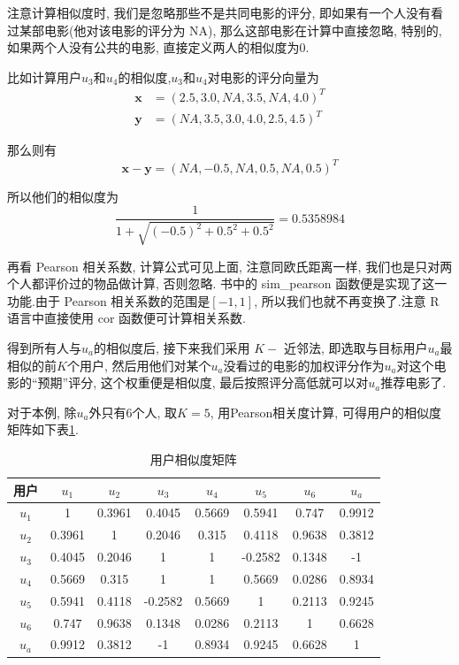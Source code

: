 \documentclass[a4paper,UTF8]{ctexart}
\theoremstyle{plain} \newtheorem{theorem}{定理}[section]
\theoremstyle{plain} \newtheorem{definition}{定义}[section]
\theoremstyle{plain} \newtheorem{lemma}{引理}[section]
\theoremstyle{plain} \newtheorem{proposition}{命题}[section]
\theoremstyle{plain} \newtheorem{example}{例}[section]
\theoremstyle{plain} \newtheorem{remark}{注}[section]
\theoremstyle{plain} \newtheorem{corollary}{推论}[section]
\begin{document}
注意计算相似度时, 我们是忽略那些不是共同电影的评分, 即如果有一个人没有看过某部电影(他对该电影的评分为 NA), 那么这部电影在计算中直接忽略, 特别的, 如果两个人没有公共的电影, 直接定义两人的相似度为$0$.

比如计算用户$u_3$和$u_4$的相似度,$u_3$和$u_4$对电影的评分向量为
\begin{align*}
\bm{x} & = (2.5, 3.0, NA, 3.5, NA, 4.0)^{T} \\ 
\bm{y} & = (NA, 3.5, 3.0, 4.0, 2.5, 4.5)^{T}
\end{align*}

那么则有
\begin{equation*}
\bm{x} - \bm{y} = (NA, -0.5, NA, 0.5, NA, 0.5)^{T}
\end{equation*}

所以他们的相似度为
\begin{equation*}
\frac{1}{1+ \sqrt{(-0.5)^2 + 0.5^2 + 0.5^2}} = 0.5358984
\end{equation*}

再看 Pearson 相关系数, 计算公式可见上面, 注意同欧氏距离一样, 我们也是只对两个人都评价过的物品做计算, 否则忽略. 书中的 sim\_pearson 函数便是实现了这一功能.由于 Pearson 相关系数的范围是$[-1,1]$, 所以我们也就不再变换了.注意 R 语言中直接使用 cor 函数便可计算相关系数.

得到所有人与$u_a$的相似度后, 接下来我们采用 $K-$ 近邻法, 即选取与目标用户$u_a$最相似的前$K$个用户, 然后用他们对某个$u_a$没看过的电影的加权评分作为$u_a$对这个电影的“预期”评分, 这个权重便是相似度, 最后按照评分高低就可以对$u_a$推荐电影了.

对于本例, 除$u_a$外只有$6$个人, 取$K=5$, 用Pearson相关度计算, 可得用户的相似度矩阵如下表\ref{simuser}.
\begin{table}[!htb]
\centering
\caption{用户相似度矩阵}
\label{simuser}
\begin{tabular}{c|c|c|c|c|c|c|c}
	\hline
    用户 & $u_1$ & $u_2$ & $u_3$ & $u_4$ & $u_5$ & $u_6$ & $u_a$ \\
    \hline
	$u_1$ & 1 & 0.3961 & 0.4045 & 0.5669 & 0.5941 & 0.747 & 0.9912 \\ 
	\hline
	$u_2$ & 0.3961 & 1 & 0.2046 & 0.315 & 0.4118 & 0.9638 & 0.3812 \\ 
	\hline
	$u_3$ & 0.4045 & 0.2046 & 1 & 1 & -0.2582 & 0.1348 & -1 \\ 
	\hline
	$u_4$ & 0.5669 & 0.315 & 1 & 1 & 0.5669 & 0.0286 & 0.8934 \\ 
	\hline
	$u_5$ & 0.5941 & 0.4118 & -0.2582 & 0.5669 & 1 & 0.2113 & 0.9245 \\ 
	\hline
	$u_6$ & 0.747 & 0.9638 & 0.1348 & 0.0286 & 0.2113 & 1 & 0.6628 \\ 
	\hline
	$u_a$ & 0.9912 & 0.3812 & -1 & 0.8934 & 0.9245 & 0.6628 & 1 \\ 
	\hline
\end{tabular}
\end{table}
\end{document}
